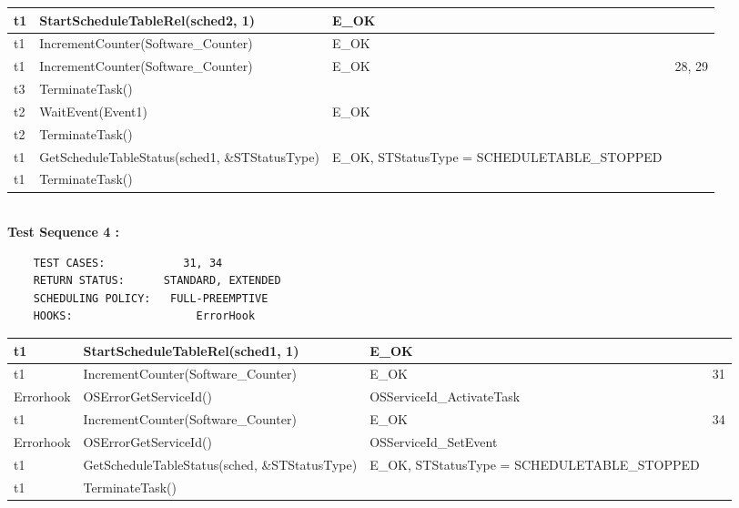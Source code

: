 \documentclass[10pt]{article}
\newlength{\Li}\settowidth{\Li}{Running}
\newlength{\Lii}\setlength{\Lii}{7cm}
\newlength{\Liiii}\setlength{\Liiii}{0.9cm}
\newlength{\Liii}\setlength{\Liii}{\textwidth} \addtolength{\Liii}{-\Li} \addtolength{\Liii}{-\Lii} \addtolength{\Liii}{-\Liiii}
\begin{document}
\begin{supertabular}{|p{\Li}|p{\Lii}|p{\Liii}|p{\Liiii}|}
	t1	& StartScheduleTableRel(sched2, 1)										& E\_OK												& \\ \hline
	t1	& IncrementCounter(Software\_Counter)										& E\_OK												& \\ \hline
	t1	& IncrementCounter(Software\_Counter)										& E\_OK												& 28, 29 \\ \hline

	t3	& TerminateTask()														& 													& \\ \hline

	t2	& WaitEvent(Event1)														& E\_OK												& \\ \hline
	t2	& TerminateTask()														& 													& \\ \hline

	t1	& GetScheduleTableStatus(sched1, \&STStatusType)							& E\_OK, STStatusType = SCHEDULETABLE\_STOPPED		& \\ \hline
	t1	& TerminateTask()														& 													& \\ \hline
	\end{supertabular}\\
		
	\textbf{Test Sequence 4 :}
	\begin{lstlisting}
	TEST CASES:		       31, 34
	RETURN STATUS:	  	STANDARD, EXTENDED
	SCHEDULING POLICY:   FULL-PREEMPTIVE
	HOOKS:			         ErrorHook
	\end{lstlisting}
	
	
	\begin{supertabular}{|p{\Li}|p{\Lii}|p{\Liii}|p{\Liiii}|} \hline 
	t1		& StartScheduleTableRel(sched1, 1)										& E\_OK												& \\ \hline
	t1		& IncrementCounter(Software\_Counter)										& E\_OK												& 31\\ \hline
	Errorhook	& OSErrorGetServiceId()													& OSServiceId\_ActivateTask								& \\ \hline
	t1		& IncrementCounter(Software\_Counter)										& E\_OK												& 34\\ \hline
	Errorhook	& OSErrorGetServiceId()													& OSServiceId\_SetEvent									& \\ \hline
	t1		& GetScheduleTableStatus(sched, \&STStatusType)							& E\_OK, STStatusType = SCHEDULETABLE\_STOPPED		& \\ \hline
	t1		& TerminateTask()														& 													& \\ \hline
	\end{supertabular}\\
	
\end{document}
